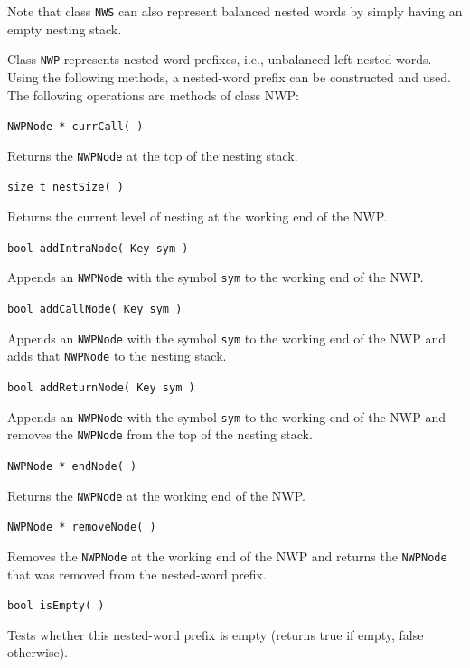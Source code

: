 \documentclass{llncs}
\begin{document}
 \noindent Note that class \texttt{NWS} can also represent balanced nested words by simply having an empty nesting stack. 

Class \texttt{NWP} represents nested-word prefixes, i.e., unbalanced-left nested words. Using the following methods, a nested-word prefix can be constructed and used. \\

\noindent The following operations are methods of class NWP:

\begin{description}

  \item\texttt{NWPNode * currCall( ) }

    Returns the \texttt{NWPNode} at the top of the nesting stack.

  \item\texttt{size\_t nestSize( ) }

    Returns the current level of nesting at the working end of the NWP.

  \item\texttt{bool addIntraNode( Key sym ) }

    Appends an \texttt{NWPNode} with the symbol \texttt{sym} to the working end of the NWP.

  \item\texttt{bool addCallNode( Key sym ) }

    Appends an \texttt{NWPNode} with the symbol \texttt{sym} to the working end of the NWP and adds that \texttt{NWPNode} to the nesting stack.

  \item\texttt{bool addReturnNode( Key sym ) }

    Appends an \texttt{NWPNode} with the symbol \texttt{sym} to the working end of the NWP and removes the \texttt{NWPNode} from the top of the nesting stack.

  \item\texttt{NWPNode * endNode( ) }

    Returns the \texttt{NWPNode} at the working end of the NWP.

  \item\texttt{NWPNode * removeNode( ) }

    Removes the \texttt{NWPNode} at the working end of the NWP and returns the \texttt{NWPNode} that was removed from the nested-word prefix.  

  \item\texttt{bool isEmpty( ) }
    
    Tests whether this nested-word prefix is empty (returns true if empty, false otherwise). \\

\end{description}
\end{document}
